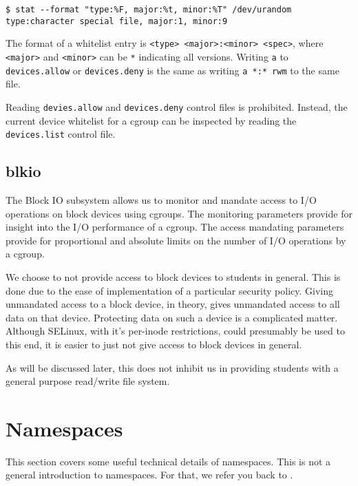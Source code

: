 \begin{lstlisting}
$ stat --format "type:%F, major:%t, minor:%T" /dev/urandom 
type:character special file, major:1, minor:9
\end{lstlisting}

The format of a whitelist entry is \texttt{<type> <major>:<minor> <spec>},
where \texttt{<major>} and \texttt{<minor>} can be \texttt{*} indicating all
versions. Writing \texttt{a} to \texttt{devices.allow} or \texttt{devices.deny}
is the same as writing \texttt{a *:* rwm} to the same file.

Reading \texttt{devies.allow} and \texttt{devices.deny} control files is
prohibited. Instead, the current device whitelist for a cgroup can be inspected
by reading the \texttt{devices.list} control file.

\subsection{blkio}

The Block IO subsystem allows us to monitor and mandate access to I/O
operations on block devices using cgroups\cite{blkio-controller.txt}. The
monitoring parameters provide for insight into the I/O performance of a cgroup.
The access mandating parameters provide for proportional and absolute limits on
the number of I/O operations by a cgroup.

We choose to not provide access to block devices to students in general. This
is done due to the ease of implementation of a particular security policy.
Giving unmandated access to a block device, in theory, gives unmandated access
to all data on that device. Protecting data on such a device is a complicated
matter. Although SELinux, with it's per-inode restrictions, could presumably be
used to this end, it is easier to just not give access to block devices in
general.

As will be discussed later, this does not inhibit us in providing students with
a general purpose read/write file system.

\section{Namespaces}

\label{appendix:namespaces}

This section covers some useful technical details of namespaces. This
is not a general introduction to namespaces. For that, we refer you back to
.

